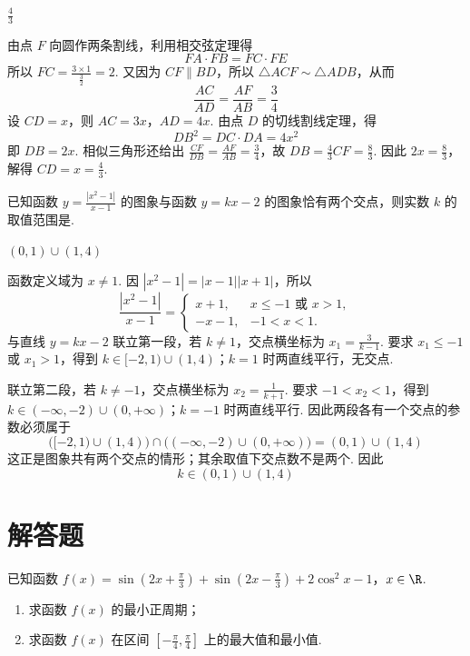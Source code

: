 \begin{answer}
\(\frac{4}{3}\)
\end{answer}

\begin{solution}
由点 \(F\) 向圆作两条割线，利用相交弦定理得
\[
FA\cdot FB=FC\cdot FE
\]
所以 \(FC=\frac{3\times1}{\frac{3}{2}}=2\). 又因为 \(CF\parallel BD\)，所以 \(\triangle ACF\sim\triangle ADB\)，从而
\[
\frac{AC}{AD}=\frac{AF}{AB}=\frac34
\]
设 \(CD=x\)，则 \(AC=3x\)，\(AD=4x\). 由点 \(D\) 的切线割线定理，得
\[
DB^2=DC\cdot DA=4x^2
\]
即 \(DB=2x\). 相似三角形还给出 \(\frac{CF}{DB}=\frac{AF}{AB}=\frac34\)，故 \(DB=\frac43CF=\frac83\). 因此 \(2x=\frac83\)，解得 \(CD=x=\frac43\).
\end{solution}

\begin{problem}
已知函数 \( y = \frac{|x^2 - 1|}{x - 1} \) 的图象与函数 \( y = kx - 2 \) 的图象恰有两个交点，则实数 \( k \) 的取值范围是\fillinblank{}.
\end{problem}

\begin{answer}
\((0,1)\cup(1,4)\)
\end{answer}

\begin{solution}
函数定义域为 \(x\neq1\). 因 \(|x^2-1|=|x-1||x+1|\)，所以
\[
\frac{|x^2-1|}{x-1}=\begin{cases}
x+1,&x\leqslant-1\text{ 或 }x>1,\\
-x-1,&-1<x<1.
\end{cases}
\]
与直线 \(y=kx-2\) 联立第一段，若 \(k\neq1\)，交点横坐标为 \(x_1=\frac3{k-1}\). 要求 \(x_1\leqslant-1\) 或 \(x_1>1\)，得到 \(k\in[-2,1)\cup(1,4)\)；\(k=1\) 时两直线平行，无交点.

联立第二段，若 \(k\neq-1\)，交点横坐标为 \(x_2=\frac1{k+1}\). 要求 \(-1<x_2<1\)，得到 \(k\in(-\infty,-2)\cup(0,+\infty)\)；\(k=-1\) 时两直线平行. 因此两段各有一个交点的参数必须属于
\[
\bigl([-2,1)\cup(1,4)\bigr)\cap\bigl((-\infty,-2)\cup(0,+\infty)\bigr)=(0,1)\cup(1,4)
\]
这正是图象共有两个交点的情形；其余取值下交点数不是两个. 因此
\[
k\in(0,1)\cup(1,4)
\]
\end{solution}

\section{解答题}

\begin{problem}
已知函数 \(f(x) = \sin \left(2x + \frac{\pi}{3}\right) + \sin \left(2x - \frac{\pi}{3}\right) + 2\cos^2 x - 1\)，\(x \in \R\).

\begin{enumerate}
\item 求函数 \( f(x) \) 的最小正周期；
\item 求函数 \( f(x) \) 在区间 \( \left[-\frac{\pi}{4}, \frac{\pi}{4}\right] \) 上的最大值和最小值.
\end{enumerate}

\end{problem}

